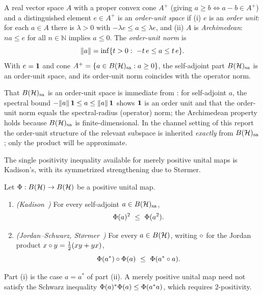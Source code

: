 \begin{definition}\label{def:order-unit}
A real vector space $A$ with a proper convex cone $A^{+}$ (giving
$a\ge b\iff a-b\in A^{+}$) and a distinguished element $e\in A^{+}$ is an
\emph{order-unit space} if (i) $e$ is an \emph{order unit}: for each $a\in A$
there is $\lambda>0$ with $-\lambda e\le a\le\lambda e$, and (ii) $A$ is
\emph{Archimedean}: $na\le e$ for all $n\in\mathbb N$ implies $a\le 0$. The
\emph{order-unit norm} is
\[
  \lVert a \rVert=\inf\{t>0:\ -t\,e\le a\le t\,e\}.
\]
With $e=\mathbf{1}$ and cone $A^{+}=\{a\in B(\mathcal{H})_{\mathrm{sa}}:a\ge 0\}$, the self-adjoint part $B(\mathcal{H})_{\mathrm{sa}}$
is an order-unit space, and its order-unit norm coincides with the operator norm.
\end{definition}

\begin{remark}\label{rem:order-unit-justification}
That $B(\mathcal{H})_{\mathrm{sa}}$ is an order-unit space is immediate from
: for self-adjoint $a$, the spectral bound
$-\lVert a \rVert\,\mathbf{1}\le a\le\lVert a \rVert\,\mathbf{1}$ shows $\mathbf{1}$ is an order unit and that the
order-unit norm equals the spectral-radius (operator) norm; the Archimedean
property holds because $B(\mathcal{H})_{\mathrm{sa}}$ is finite-dimensional. In the channel setting of
this report the order-unit structure of the relevant subspace is inherited
\emph{exactly} from $B(\mathcal{H})_{\mathrm{sa}}$; only the product will be approximate.
\end{remark}

The single positivity inequality available for merely positive unital maps is
Kadison's, with its symmetrized strengthening due to St{\o}rmer.

\begin{proposition}\label{prop:kadison-js}
Let $\Phi:B(\mathcal{H})\to B(\mathcal{H})$ be a positive unital map.
\begin{enumerate}[label=(\roman*),leftmargin=*]
  \item \emph{(Kadison~\cite{Kadison1952})} For every self-adjoint $a\in B(\mathcal{H})_{\mathrm{sa}}$,
        \[
          \Phimap(a)^2\ \le\ \Phimap(a^2).
        \]
  \item \emph{(Jordan--Schwarz, St{\o}rmer~\cite{Stormer1965,vanLuijkWilming2026})}
        For every $a\in B(\mathcal{H})$, writing $\circ$ for the Jordan product
        $x\circ y=\tfrac12(xy+yx)$,
        \[
          \Phi(a^*)\circ\Phi(a)\ \le\ \Phi(a^*\circ a).
        \]
\end{enumerate}
Part (i) is the case $a=a^*$ of part (ii). A merely positive unital map need not
satisfy the Schwarz inequality $\Phi(a)^*\Phi(a)\le\Phi(a^*a)$, which
requires $2$-positivity.
\end{proposition}

